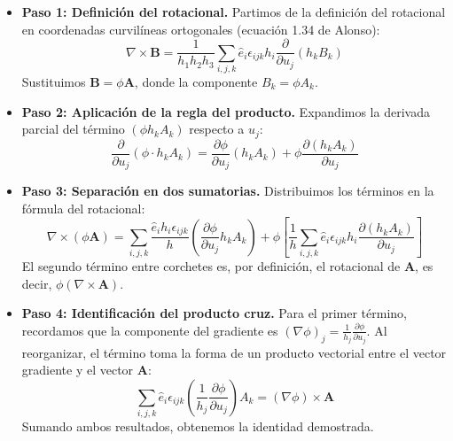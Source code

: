 \documentclass[a4paper]{article}
\begin{document}
\begin{itemize}
    \item \textbf{Paso 1: Definición del rotacional.} 
    Partimos de la definición del rotacional en coordenadas curvilíneas ortogonales (ecuación 1.34 de Alonso):
    \begin{equation}
        \nabla \times \mathbf{B} = \frac{1}{h_1 h_2 h_3} \sum_{i,j,k} \hat{e}_i \epsilon_{ijk} h_i \frac{\partial}{\partial u_j} (h_k B_k)
    \end{equation}
    Sustituimos $\mathbf{B} = \phi \mathbf{A}$, donde la componente $B_k = \phi A_k$.

    \item \textbf{Paso 2: Aplicación de la regla del producto.}
    Expandimos la derivada parcial del término $(\phi h_k A_k)$ respecto a $u_j$:
    \begin{equation}
        \frac{\partial}{\partial u_j} (\phi \cdot h_k A_k) = \frac{\partial \phi}{\partial u_j} (h_k A_k) + \phi \frac{\partial (h_k A_k)}{\partial u_j}
    \end{equation}

    \item \textbf{Paso 3: Separación en dos sumatorias.}
    Distribuimos los términos en la fórmula del rotacional:
    \begin{equation}
        \nabla \times (\phi \mathbf{A}) = \sum_{i,j,k} \frac{\hat{e}_i h_i \epsilon_{ijk}}{h} \left( \frac{\partial \phi}{\partial u_j} h_k A_k \right) + \phi \left[ \frac{1}{h} \sum_{i,j,k} \hat{e}_i \epsilon_{ijk} h_i \frac{\partial (h_k A_k)}{\partial u_j} \right]
    \end{equation}
    El segundo término entre corchetes es, por definición, el rotacional de $\mathbf{A}$, es decir, $\phi(\nabla \times \mathbf{A})$.

    \item \textbf{Paso 4: Identificación del producto cruz.}
    Para el primer término, recordamos que la componente del gradiente es $(\nabla \phi)_j = \frac{1}{h_j} \frac{\partial \phi}{\partial u_j}$. Al reorganizar, el término toma la forma de un producto vectorial entre el vector gradiente y el vector $\mathbf{A}$:
    \begin{equation}
        \sum_{i,j,k} \hat{e}_i \epsilon_{ijk} \left( \frac{1}{h_j} \frac{\partial \phi}{\partial u_j} \right) A_k = (\nabla \phi) \times \mathbf{A}
    \end{equation}
    Sumando ambos resultados, obtenemos la identidad demostrada.
\end{itemize}
\end{document}
